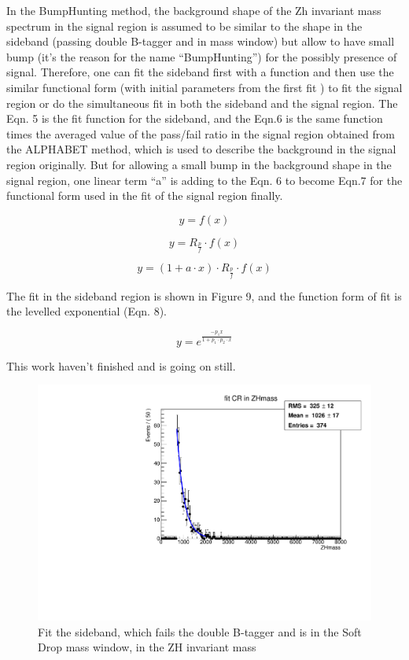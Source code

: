 \documentclass{article}
\begin{document}
In the BumpHunting method, the background shape of the Zh invariant mass spectrum in the signal region is assumed to be similar to the shape in the sideband (passing double B-tagger and in mass window) but allow to have small bump (it's the reason for the name ``BumpHunting'') for the possibly presence of signal. Therefore, one can fit the sideband first with a function and then use the similar functional form (with initial parameters from the first fit ) to fit the signal region or do the simultaneous fit in both the sideband and the signal region. The Eqn. 5 is the fit function for the sideband, and the Eqn.6 is the same function times the averaged value of the pass/fail ratio in the signal region obtained from the ALPHABET method, which is used to describe the background in the signal region originally. But for allowing a small bump in the background shape in the signal region, one linear term ``a'' is adding to the Eqn. 6 to become Eqn.7 for the functional form used in the fit of the signal region finally.     

\begin{equation}
y=f(x) 
\end{equation}

\begin{equation}
y=R_{\frac{p}{f}}\cdot f(x) 
\end{equation}

\begin{equation}
y=(1+a\cdot x)\cdot R_{\frac{p}{f}}\cdot f(x)
\end{equation}

The fit in the sideband region is shown in Figure 9, and the function form of fit is the levelled exponential (Eqn. 8). 

\begin{equation}
y=e^{\frac{-p_{1}x}{1+p_{1}\cdot p_{2}\cdot x}}
\end{equation}

This work haven't finished and is going on still.

\begin{figure}

\centering
\includegraphics[width=.7\textwidth]{figures/fit_CR_in_ZHmass.pdf}
\caption{Fit the sideband, which fails the double B-tagger and is in the Soft Drop mass window, in the ZH invariant mass}
\label{pics:blablabla}
\end{figure}
\end{document}
